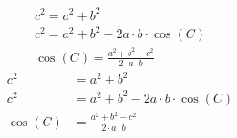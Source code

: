 \documentclass{article}
\begin{document}
\begin{align}
c^2 
	= a^2 + b^2		\\
c^2
	= a^2 + b^2 - 2 a \cdot b \cdot \cos(C)		\\
\cos(C)
	= \frac{a^2 + b^2 - c^2}{2 \cdot a \cdot b}
\end{align}
\begin{align}
c^2 
	& = a^2 + b^2		\\
c^2
	& = a^2 + b^2 - 2 a \cdot b \cdot \cos(C)		\\
\cos(C)
	& = \frac{a^2 + b^2 - c^2}{2 \cdot a \cdot b}
\end{align}
\end{document}
